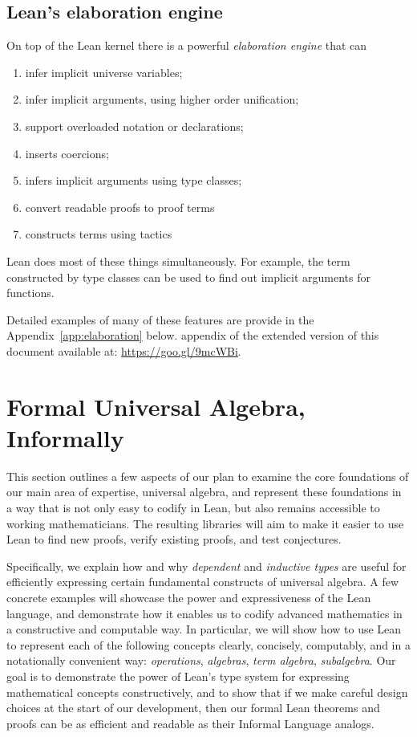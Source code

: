 \documentclass[12pt]{amsart}  %
\newcommand\extverurl{https://goo.gl/9mcWBi}
\begin{document}
\subsection{Lean's elaboration engine\protect\footnotemark}
    
On top of the Lean kernel there is a powerful \emph{elaboration engine} that can
\begin{enumerate}
\item infer implicit universe variables;
\item infer implicit arguments, using higher order unification;
\item support overloaded notation or declarations;
\item inserts coercions;
\item infers implicit arguments using type classes;
\item convert readable proofs to proof terms
\item constructs terms using tactics
\end{enumerate}
Lean does most of these things simultaneously. For example, the term constructed by
type classes can be used to find out implicit arguments for functions.

Detailed examples of many of these features are provide in the 
\ifextver 
Appendix~\ref{app:elaboration} below.
\else 
appendix of the extended version of this document available at: \url{\extverurl}.
\fi

 


\section{Formal Universal Algebra, Informally}
This section outlines a few aspects of our plan to examine the core foundations of our main area of expertise, universal algebra, and represent these foundations in a way that is not only easy to codify in Lean, but also remains accessible to working mathematicians. The resulting libraries will aim to make it easier to use Lean to find new proofs, verify existing proofs, and test conjectures.

Specifically, we explain how and why \emph{dependent} and \emph{inductive types} 
are useful for efficiently expressing certain fundamental constructs of universal algebra.
A few concrete examples will showcase the power and expressiveness of the Lean language,
and demonstrate how it enables us to codify advanced mathematics in a constructive and computable way.  In particular, we will show how to use Lean to represent each of the following concepts 
clearly, concisely, computably, and in a notationally convenient way:
\emph{operations}, \emph{algebras}, \emph{term algebra}, \emph{subalgebra}.
Our goal is to demonstrate the power of Lean's type system for expressing 
mathematical concepts constructively, and to show that if we make
careful design choices at the start of our development, then our formal Lean 
theorems and proofs can be as efficient and readable as their Informal Language analogs.
\end{document}
